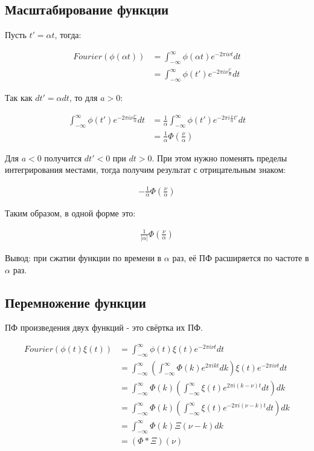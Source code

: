 \documentclass[10pt,a4paper,oneside]{article}
\begin{document}
\subsection{Масштабирование функции}

Пусть $t' = \alpha t$, тогда:

\[
    \begin{aligned}
        Fourier\left(\phi(\alpha t)\right)
        &= \int_{-\infty}^{\infty} \phi(\alpha t) e^{-2\pi i\nu t} dt \\
        &= \int_{-\infty}^{\infty} \phi(t') e^{-2\pi i\nu \frac{t'}{\alpha}} dt
    \end{aligned}
\]

Так как $dt' = \alpha dt$, то для $a > 0$:

\[
    \begin{aligned}
        \int_{-\infty}^{\infty} \phi(t') e^{-2\pi i\nu \frac{t'}{\alpha}} dt
        &= \frac{1}{\alpha} \int_{-\infty}^{\infty} \phi(t') e^{-2\pi i\frac{\nu}{\alpha} t'} dt \\
        &= \frac{1}{\alpha} \Phi\left(\frac{\nu}{\alpha}\right)
    \end{aligned}
\]

Для $a < 0$ получится $dt' < 0$ при $dt > 0$. При этом нужно поменять пределы интегрирования местами, тогда получим результат с отрицательным знаком:

\[
    \begin{aligned}
        -\frac{1}{\alpha} \Phi\left(\frac{\nu}{\alpha}\right)
    \end{aligned}
\]

Таким образом, в одной форме это:

\[
    \begin{aligned}
        \frac{1}{\left|\alpha\right|} \Phi\left(\frac{\nu}{\alpha}\right)
    \end{aligned}
\]

Вывод: при сжатии функции по времени в $\alpha$ раз, её ПФ расширяется по частоте в $\alpha$ раз.

\subsection{Перемножение функции}

ПФ произведения двух функций - это свёртка их ПФ.

\[
    \begin{aligned}
        Fourier\left(\phi(t)\xi(t)\right) 
        &= \int_{-\infty}^{\infty} \phi(t)\xi(t) e^{-2\pi i\nu t} dt \\
        &= \int_{-\infty}^{\infty} \left( \int_{-\infty}^{\infty} \Phi(k) e^{2\pi i kt} dk \right) \xi(t) e^{-2\pi i\nu t} dt \\
        &= \int_{-\infty}^{\infty} \Phi(k) \left( \int_{-\infty}^{\infty} \xi(t) e^{2\pi i (k - \nu)t} dt \right) dk \\
        &= \int_{-\infty}^{\infty} \Phi(k) \left( \int_{-\infty}^{\infty} \xi(t) e^{-2\pi i (\nu - k)t} dt \right) dk \\
        &= \int_{-\infty}^{\infty} \Phi(k) \Xi(\nu - k) dk \\
        &= \left(\Phi * \Xi\right)(\nu)
    \end{aligned}
\]
\end{document}

